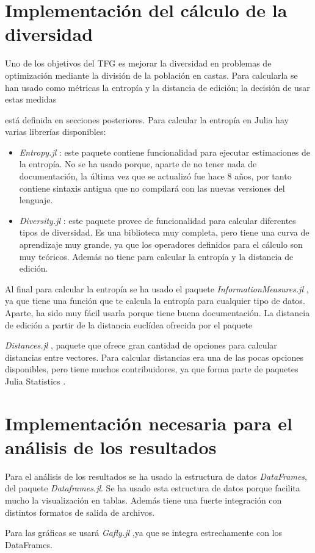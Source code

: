 \section{Implementación del cálculo de la diversidad}

Uno de los objetivos del TFG es mejorar la diversidad en problemas de optimización mediante la división de la población en castas.
Para calcularla se han usado como métricas la entropía y la distancia de edición; la decisión de usar estas medidas

está definida en secciones posteriores. Para calcular la entropía en Julia hay varias librerías disponibles:

\begin{itemize}
    \item \emph{Entropy.jl} \cite{entropy_jl}: este paquete contiene funcionalidad para ejecutar estimaciones de la entropía. No se ha usado porque,
    aparte de no tener nada de documentación, la última vez que se actualizó fue hace 8 años, por tanto contiene
    sintaxis antigua que no compilará con las nuevas versiones del lenguaje.
    \item \emph{Diversity.jl} \cite{diversity_jl}: este paquete provee de funcionalidad para calcular diferentes
    tipos de diversidad. Es una biblioteca muy completa, pero tiene una curva de aprendizaje muy grande, ya que los
    operadores definidos para el cálculo son muy teóricos. Además no tiene para calcular la entropía y la distancia
    de edición.
\end{itemize}

Al final para calcular la entropía se ha usado el paquete \emph{InformationMeasures.jl} \cite{informationMeasures_jl}, ya 
que tiene una función que te calcula la entropía para cualquier tipo de datos. Aparte, ha sido muy fácil usarla porque 
tiene buena documentación. La distancia de edición a partir de la distancia euclídea ofrecida por el paquete

\emph{Distances.jl} \cite{distances_jl}, paquete que ofrece gran cantidad de opciones para calcular distancias entre vectores.
Para calcular distancias era una de las pocas opciones disponibles, pero tiene muchos contribuidores, ya que forma 
parte de paquetes Julia Statistics \cite{stats_jl}.

\section{Implementación necesaria para el análisis de los resultados}

Para el análisis de los resultados se ha usado la estructura de datos \emph{DataFrames}, del paquete \emph{Dataframes.jl}. Se
ha usado esta estructura de datos porque facilita mucho la visualización en tablas. Además tiene una fuerte
integración con distintos formatos de salida de archivos. 

Para las gráficas se usará \emph{Gafly.jl} \cite{gadfly_jl},ya que se integra estrechamente con los DataFrames.
